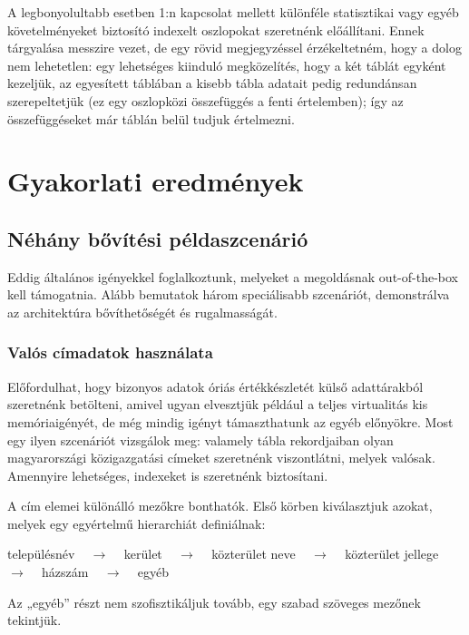 \documentclass[
    parspace,
    noindent,
    nohyp,
]{elteiktdk}[2023/04/10]
\begin{document}
A legbonyolultabb esetben 1:n kapcsolat mellett különféle statisztikai
vagy egyéb követelményeket biztosító indexelt oszlopokat szeretnénk előállítani.
Ennek tárgyalása messzire vezet,
de egy rövid megjegyzéssel érzékeltetném, hogy a dolog nem lehetetlen:
egy lehetséges kiinduló megközelítés, hogy a két táblát egyként kezeljük,
az egyesített táblában a kisebb tábla adatait pedig redundánsan szerepeltetjük
(ez egy oszlopközi összefüggés a fenti értelemben);
így az összefüggéseket már táblán belül tudjuk értelmezni.



\chapter{Gyakorlati eredmények}

\section{Néhány bővítési példaszcenárió}

Eddig általános igényekkel foglalkoztunk,
melyeket a megoldásnak out-of-the-box kell támogatnia.
Alább bemutatok három speciálisabb szcenáriót,
demonstrálva az architektúra bővíthetőségét és rugalmasságát.

\subsection{Valós címadatok használata}

Előfordulhat, hogy bizonyos adatok óriás értékkészletét külső adattárakból szeretnénk betölteni,
amivel ugyan elvesztjük például a teljes virtualitás kis memóriaigényét,
de még mindig igényt támaszthatunk az egyéb előnyökre.
Most egy ilyen szcenáriót vizsgálok meg:
valamely tábla rekordjaiban olyan magyarországi közigazgatási címeket szeretnénk viszontlátni,
melyek valósak.
Amennyire lehetséges, indexeket is szeretnénk biztosítani.

A cím elemei különálló mezőkre bonthatók.
Első körben kiválasztjuk azokat, melyek egy egyértelmű hierarchiát definiálnak:

\begin{center}
    településnév ~ $\rightarrow$ ~
    kerület ~ $\rightarrow$ ~
    közterület neve ~ $\rightarrow$ ~
    közterület jellege ~ $\rightarrow$ ~
    házszám ~ $\rightarrow$ ~
    egyéb
\end{center}

Az „egyéb” részt nem szofisztikáljuk tovább, egy szabad szöveges mezőnek tekintjük.
\end{document}
